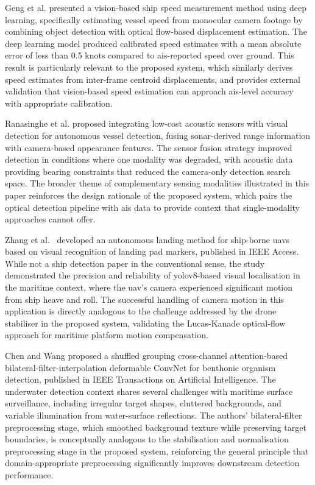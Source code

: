Geng et al. \cite{Geng2023} presented a vision-based ship speed measurement
method using deep learning, specifically estimating vessel speed from monocular
camera footage by combining object detection with optical flow-based displacement
estimation. The deep learning model produced calibrated speed estimates with a
mean absolute error of less than 0.5 knots compared to \gls{ais}-reported speed over
ground. This result is particularly relevant to the proposed system, which
similarly derives speed estimates from inter-frame centroid displacements, and
provides external validation that vision-based speed estimation can approach
\gls{ais}-level accuracy with appropriate calibration.
 
Ranasinghe et al. \cite{Ranasinghe2023} proposed integrating low-cost acoustic
sensors with visual detection for autonomous vessel detection, fusing sonar-derived
range information with camera-based appearance features. The sensor fusion strategy
improved detection in conditions where one modality was degraded, with acoustic
data providing bearing constraints that reduced the camera-only detection search
space. The broader theme of complementary sensing modalities illustrated in this
paper reinforces the design rationale of the proposed system, which pairs the
optical detection pipeline with \gls{ais} data to provide context that single-modality
approaches cannot offer.
 
Zhang et al.\ \cite{Zhang2025a} developed an autonomous landing method for
ship-borne \glspl{uav} based on visual recognition of landing
pad markers, published in IEEE Access. While not a ship detection paper in the
conventional sense, the study demonstrated the precision and reliability of
\gls{yolov8}-based visual localisation in the maritime context, where the \gls{uav}'s camera
experienced significant motion from ship heave and roll. The successful handling
of camera motion in this application is directly analogous to the challenge
addressed by the drone stabiliser in the proposed system, validating the
Lucas-Kanade optical-flow approach for maritime platform motion compensation.
 
Chen and Wang \cite{Chen2024a} proposed a shuffled grouping cross-channel
attention-based bilateral-filter-interpolation deformable ConvNet for benthonic
organism detection, published in IEEE Transactions on Artificial Intelligence.
The underwater detection context shares several challenges with maritime surface
surveillance, including irregular target shapes, cluttered backgrounds, and
variable illumination from water-surface reflections. The authors' bilateral-filter
preprocessing stage, which smoothed background texture while preserving target
boundaries, is conceptually analogous to the stabilisation and normalisation
preprocessing stage in the proposed system, reinforcing the general principle
that domain-appropriate preprocessing significantly improves downstream detection
performance.
 
